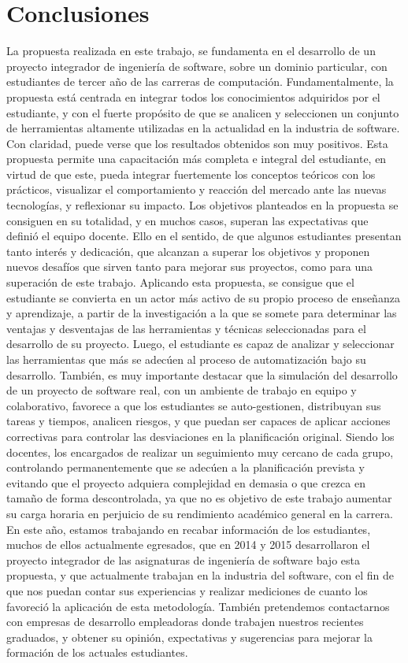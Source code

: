 \section{Conclusiones} \label{conclusion}
La propuesta realizada en este trabajo, se fundamenta en el desarrollo de un proyecto integrador de ingeniería de software, sobre un dominio 
particular, con estudiantes de tercer año de las carreras de computación. Fundamentalmente, la propuesta está centrada en integrar todos los 
conocimientos adquiridos por el estudiante, y con el fuerte propósito de que se analicen y seleccionen un conjunto de herramientas altamente 
utilizadas en la actualidad en la industria de software.
Con claridad, puede verse que los resultados obtenidos son muy positivos. Esta propuesta permite una capacitación más completa e integral del 
estudiante, en virtud de que este, pueda integrar fuertemente los conceptos teóricos con los prácticos, visualizar el comportamiento y 
reacción del mercado ante las nuevas tecnologías, y reflexionar su impacto. 
Los objetivos planteados en la propuesta se consiguen en su totalidad, y en muchos casos, superan las expectativas que definió el equipo 
docente. Ello en el sentido, de que algunos estudiantes presentan tanto interés y dedicación, que alcanzan a superar los objetivos y proponen 
nuevos desafíos que sirven tanto para mejorar sus proyectos, como para una superación de este trabajo. 
Aplicando esta propuesta, se consigue que el estudiante se convierta en un actor más activo de su propio proceso de enseñanza y aprendizaje, 
a partir de la investigación a la que se somete para determinar las ventajas y desventajas de las herramientas y técnicas seleccionadas para 
el desarrollo de su proyecto. Luego, el estudiante es capaz de analizar y seleccionar las herramientas que más se adecúen al proceso de 
automatización bajo su desarrollo. 
También, es muy importante destacar que la simulación del desarrollo de un proyecto de software real, con un ambiente de trabajo en equipo y 
colaborativo, favorece a que los estudiantes se auto-gestionen, distribuyan sus tareas y tiempos, analicen riesgos, y que puedan ser capaces de 
aplicar acciones correctivas para controlar las desviaciones en la planificación original. Siendo los docentes, los encargados de realizar un 
seguimiento muy cercano de cada grupo, controlando permanentemente que se adecúen a la planificación prevista y evitando que el proyecto  
adquiera complejidad en demasia
o que crezca en tamaño de forma descontrolada, ya que no es objetivo de este trabajo aumentar su carga horaria  en perjuicio de su 
rendimiento académico general en la carrera.
En este año, estamos trabajando en recabar información de los estudiantes, muchos de ellos actualmente egresados, que en 2014 y 2015 desarrollaron el proyecto integrador de las asignaturas de ingeniería de software bajo esta propuesta, y que actualmente trabajan en la industria del software, con el fin de que nos puedan contar sus experiencias y realizar mediciones de cuanto los favoreció la aplicación de 
esta metodología. También pretendemos contactarnos con empresas de desarrollo empleadoras donde trabajen nuestros recientes graduados, y 
obtener su opinión, expectativas y sugerencias para mejorar la formación de los actuales estudiantes.
